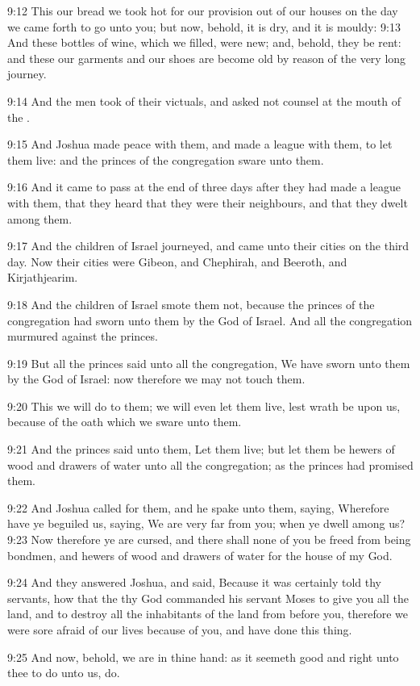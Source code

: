 9:12 This our bread we took hot for our provision out of our houses on the day we came forth to go unto you; but now, behold, it is dry, and it is mouldy: 9:13 And these bottles of wine, which we filled, were new; and, behold, they be rent: and these our garments and our shoes are become old by reason of the very long journey.

9:14 And the men took of their victuals, and asked not counsel at the mouth of the \LORD.

9:15 And Joshua made peace with them, and made a league with them, to let them live: and the princes of the congregation sware unto them.

9:16 And it came to pass at the end of three days after they had made a league with them, that they heard that they were their neighbours, and that they dwelt among them.

9:17 And the children of Israel journeyed, and came unto their cities on the third day. Now their cities were Gibeon, and Chephirah, and Beeroth, and Kirjathjearim.

9:18 And the children of Israel smote them not, because the princes of the congregation had sworn unto them by the \LORD God of Israel. And all the congregation murmured against the princes.

9:19 But all the princes said unto all the congregation, We have sworn unto them by the \LORD God of Israel: now therefore we may not touch them.

9:20 This we will do to them; we will even let them live, lest wrath be upon us, because of the oath which we sware unto them.

9:21 And the princes said unto them, Let them live; but let them be hewers of wood and drawers of water unto all the congregation; as the princes had promised them.

9:22 And Joshua called for them, and he spake unto them, saying, Wherefore have ye beguiled us, saying, We are very far from you; when ye dwell among us?  9:23 Now therefore ye are cursed, and there shall none of you be freed from being bondmen, and hewers of wood and drawers of water for the house of my God.

9:24 And they answered Joshua, and said, Because it was certainly told thy servants, how that the \LORD thy God commanded his servant Moses to give you all the land, and to destroy all the inhabitants of the land from before you, therefore we were sore afraid of our lives because of you, and have done this thing.

9:25 And now, behold, we are in thine hand: as it seemeth good and right unto thee to do unto us, do.

